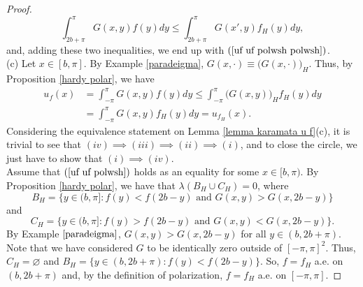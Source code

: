 \documentclass[11pt]{amsart}
\numberwithin{equation}{section}
\begin{document}
\begin{proof}
\[\int_{2b+\pi}^\pi G(x,y)f(y)dy\leq\int_{2b+\pi}^\pi G(x',y)f_H(y)dy,\]
and, adding these two inequalities, we end up with \((\ref{uf uf polwsh polwsh})\).\\
(c) Let \(x\in[b,\pi]\). By Example \ref{paradeigma}, \(G(x,\cdot)\equiv \bigl(G(x,\cdot)\bigr)_H\). Thus, by Proposition \ref{hardy polar}, we have
\begin{align*}
u_f(x)&=\int_{-\pi}^\pi G(x,y)f(y)dy\leq\int_{-\pi}^\pi \bigl(G(x,y)\bigr)_H f_H(y)dy\\
&=\int_{-\pi}^\pi G(x,y)f_H(y)dy=u_{f_H}(x).
\end{align*}
Considering the equivalence statement on Lemma \ref{lemma karamata u f}(c), it is trivial to see that \((iv)\implies(iii)\implies(ii)\implies(i)\), and to close the circle, we just have to show that \((i)\implies(iv)\).\\
Assume that \((\ref{uf uf polwsh})\) holds as an equality for some \(x\in[b,\pi).\)
By Proposition \ref{hardy polar}, we have that \(\lambda(B_H\cup C_H)=0\), where
\[B_H=\{y\in(b,\pi]:f(y)<f(2b-y)\text{ and }G(x,y)>G(x,2b-y)\}\]
and
\[C_H=\{y\in(b,\pi]:f(y)>f(2b-y)\text{ and }G(x,y)<G(x,2b-y)\}.\]
By Example \(\ref{paradeigma}\), \(G(x,y)> G(x,2b-y)\) for all \(y\in(b,2b+\pi)\). Note that we have considered  \(G\) to  be identically zero outside of \([-\pi,\pi]^2\). Thus, \(C_H=\varnothing\) and \(B_H=\{y\in(b,2b+\pi):f(y)<f(2b-y)\}\). So, \(f=f_H\) a.e. on \((b,2b+\pi)\) and, by the definition of polarization, \(f=f_H\) a.e. on \([-\pi,\pi]\).
\end{proof}
\end{document}
